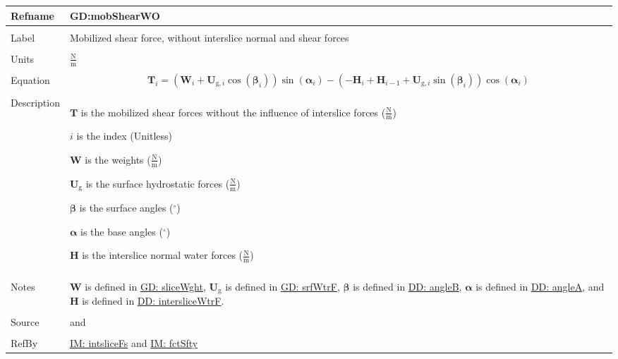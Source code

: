 \documentclass[12pt]{article}
\begin{document}
\noindent \begin{minipage}{\textwidth}
\begin{tabular}{>{\raggedright}p{}>{\raggedright\arraybackslash}p{}}
\toprule \textbf{Refname} & \textbf{GD:mobShearWO}
\label{GD:mobShearWO}
\\ \midrule \\
Label & Mobilized shear force, without interslice normal and shear forces
\\ \midrule \\
Units & $\frac{\text{N}}{\text{m}}$
\\ \midrule \\
Equation & \begin{displaymath}
           {\mathbf{T}}_{i}=\left({\mathbf{W}}_{i}+{\mathbf{U}_{\text{g},i}} \cos\left({\mathbf{β}}_{i}\right)\right) \sin\left({\mathbf{α}}_{i}\right)-\left(-{\mathbf{H}}_{i}+{\mathbf{H}}_{i-1}+{\mathbf{U}_{\text{g},i}} \sin\left({\mathbf{β}}_{i}\right)\right) \cos\left({\mathbf{α}}_{i}\right)
           \end{displaymath}
\\ \midrule \\
Description & \begin{symbDescription}
              \item{$\mathbf{T}$ is the mobilized shear forces without the influence of interslice forces ($\frac{\text{N}}{\text{m}}$)}
              \item{$i$ is the index (Unitless)}
              \item{$\mathbf{W}$ is the weights ($\frac{\text{N}}{\text{m}}$)}
              \item{${\mathbf{U}_{\text{g}}}$ is the surface hydrostatic forces ($\frac{\text{N}}{\text{m}}$)}
              \item{$\mathbf{β}$ is the surface angles (${}^{\circ}$)}
              \item{$\mathbf{α}$ is the base angles (${}^{\circ}$)}
              \item{$\mathbf{H}$ is the interslice normal water forces ($\frac{\text{N}}{\text{m}}$)}
              \end{symbDescription}
\\ \midrule \\
Notes & $\mathbf{W}$ is defined in \hyperref[GD:sliceWght]{GD: sliceWght}, ${\mathbf{U}_{\text{g}}}$ is defined in \hyperref[GD:srfWtrF]{GD: srfWtrF}, $\mathbf{β}$ is defined in \hyperref[DD:angleB]{DD: angleB}, $\mathbf{α}$ is defined in \hyperref[DD:angleA]{DD: angleA}, and $\mathbf{H}$ is defined in \hyperref[DD:intersliceWtrF]{DD: intersliceWtrF}.
\\ \midrule \\
Source & \cite{chen2005} and \cite{karchewski2012}
\\ \midrule \\
RefBy & \hyperref[IM:intsliceFs]{IM: intsliceFs} and \hyperref[IM:fctSfty]{IM: fctSfty}
\\ \bottomrule
\end{tabular}
\end{minipage}
\par~
\end{document}

